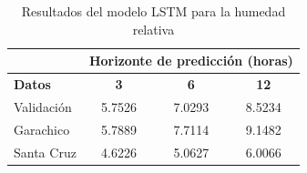 \begin{table}[h!]
\centering
\begin{tabular}{|l|c|c|c|}
\hline
\multicolumn{1}{|c|}{} & \multicolumn{3}{c|}{\textbf{Horizonte de predicción (horas)}} \\
\hline
\textbf{Datos} & \textbf{3} & \textbf{6} & \textbf{12} \\
\hline
Validación   &     5.7526            &    7.0293            &    8.5234                 \\
\hline
Garachico    &     5.7889            &     7.7114           &    9.1482                 \\
\hline
Santa Cruz &       4.6226          &   5.0627               &    6.0066                 \\
\hline
\end{tabular}
\caption{Resultados del modelo LSTM para la humedad relativa}
\label{hum_results}
\end{table}


